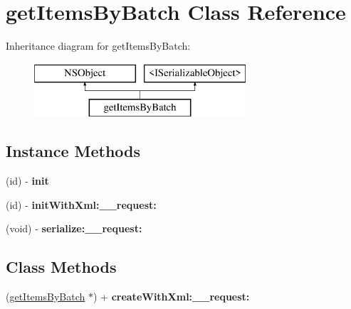 \hypertarget{interfaceget_items_by_batch}{}\section{get\+Items\+By\+Batch Class Reference}
\label{interfaceget_items_by_batch}
Inheritance diagram for get\+Items\+By\+Batch\+:\begin{figure}[H]
\begin{center}
\leavevmode
\includegraphics[height=2.000000cm]{interfaceget_items_by_batch}
\end{center}
\end{figure}
\subsection*{Instance Methods}
\begin{DoxyCompactItemize}
\item 
\hypertarget{interfaceget_items_by_batch_af80cef75984d51ecf41f4caac3a29964}{}(id) -\/ {\bfseries init}\label{interfaceget_items_by_batch_af80cef75984d51ecf41f4caac3a29964}

\item 
\hypertarget{interfaceget_items_by_batch_a422b1f69e79d9b44c8d8a7e85df84fb8}{}(id) -\/ {\bfseries init\+With\+Xml\+:\+\_\+\+\_\+request\+:}\label{interfaceget_items_by_batch_a422b1f69e79d9b44c8d8a7e85df84fb8}

\item 
\hypertarget{interfaceget_items_by_batch_a3ebbba313e97f3b7499ba82e2f4f5b2e}{}(void) -\/ {\bfseries serialize\+:\+\_\+\+\_\+request\+:}\label{interfaceget_items_by_batch_a3ebbba313e97f3b7499ba82e2f4f5b2e}

\end{DoxyCompactItemize}
\subsection*{Class Methods}
\begin{DoxyCompactItemize}
\item 
\hypertarget{interfaceget_items_by_batch_ab275a97161f7f2aa5ea84256f948aa16}{}(\hyperlink{interfaceget_items_by_batch}{get\+Items\+By\+Batch} $\ast$) + {\bfseries create\+With\+Xml\+:\+\_\+\+\_\+request\+:}\label{interfaceget_items_by_batch_ab275a97161f7f2aa5ea84256f948aa16}

\end{DoxyCompactItemize}
